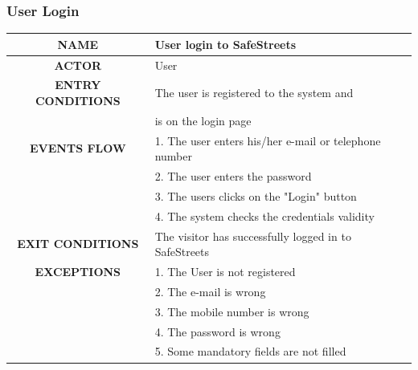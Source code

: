 \documentclass[12pt,a4paper]{article}
\begin{document}
\subsubsection{User Login}
	\begin{center}
			\begin{tabular}{| c | l |}
				\hline
				\textbf{NAME} & User login to SafeStreets \\
				\hline
				\textbf{ACTOR} & User \\
				\hline
				\textbf{ENTRY CONDITIONS} & The user is registered to the system and \\
				&	is on the login page\\
				\hline
				\textbf{EVENTS FLOW}  &
				1. The user enters his/her e-mail or telephone number\\
				&2. The user enters the password\\
				&3. The users clicks on the "Login" button\\
				&4. The system checks the credentials validity\\
				\hline
				\textbf{EXIT CONDITIONS}  & The visitor has successfully logged in to SafeStreets\\ \hline
				\textbf{EXCEPTIONS} &
				1. The User is not registered\\
				&2. The e-mail is wrong\\
				&3. The mobile number is wrong\\
				&4. The password is wrong\\
				&5. Some mandatory fields are not filled\\
				\hline
			\end{tabular}
		\end{center}
\newpage
\end{document}
